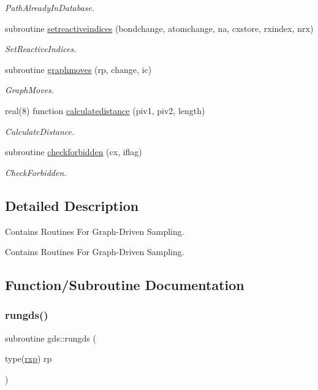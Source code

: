 \begin{DoxyCompactItemize}
\begin{DoxyCompactList}\small\item\em Path\+Already\+In\+Database. \end{DoxyCompactList}\item 
subroutine \mbox{\hyperlink{namespacegds_a0303bed58c58943730fddcabfe42aaa3}{setreactiveindices}} (bondchange, atomchange, na, cxstore, rxindex, nrx)
\begin{DoxyCompactList}\small\item\em Set\+Reactive\+Indices. \end{DoxyCompactList}\item 
subroutine \mbox{\hyperlink{namespacegds_ad2b8d4cdd489645b501e20ea68ac1601}{graphmoves}} (rp, change, ic)
\begin{DoxyCompactList}\small\item\em Graph\+Moves. \end{DoxyCompactList}\item 
real(8) function \mbox{\hyperlink{namespacegds_a5188bea0bc64cb9e00ab22d7a0e861b5}{calculatedistance}} (piv1, piv2, length)
\begin{DoxyCompactList}\small\item\em Calculate\+Distance. \end{DoxyCompactList}\item 
subroutine \mbox{\hyperlink{namespacegds_a37303571738e9c68948bad724cdbcddf}{checkforbidden}} (cx, iflag)
\begin{DoxyCompactList}\small\item\em Check\+Forbidden. \end{DoxyCompactList}\end{DoxyCompactItemize}


\subsection{Detailed Description}
Contains Routines For Graph-\/\+Driven Sampling. 

Contains Routines For Graph-\/\+Driven Sampling. 

\subsection{Function/\+Subroutine Documentation}
\mbox{\label{namespacegds_a505bda8be8e12ca409e712dbe5b808fe}} 
\subsubsection{\texorpdfstring{rungds()}{rungds()}}
{\footnotesize\ttfamily subroutine gds\+::rungds (\begin{DoxyParamCaption}\item[{type(\mbox{\hyperlink{structrpath_1_1rxp}{rxp}})}]{rp }\end{DoxyParamCaption})}



